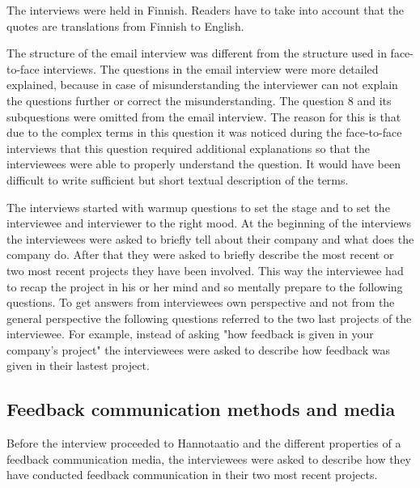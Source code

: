 \documentclass[english,12pt,a4paper,pdftex]{article}
\begin{document}
The interviews were held in Finnish. Readers have to take into account that the quotes are translations from Finnish to English.


The structure of the email interview was different from the structure used in face-to-face interviews. The questions in the email interview were more detailed explained, because in case of misunderstanding the interviewer can not explain the questions further or correct the misunderstanding. The question 8 and its subquestions were omitted from the email interview. The reason for this is that due to the complex terms in this question it was noticed during the face-to-face interviews that this question required additional explanations so that the interviewees were able to properly understand the question. It would have been difficult to write sufficient but short textual description of the terms.

The interviews started with warmup questions to set the stage and to set the interviewee and interviewer to the right mood. At the beginning of the interviews the interviewees were asked to briefly tell about their company and what does the company do. After that they were asked to briefly describe the most recent or two most recent projects they have been involved. This way the interviewee had to recap the project in his or her mind and so mentally prepare to the following questions. To get answers from interviewees own perspective and not from the general perspective the following questions referred to the two last projects of the interviewee. For example, instead of asking "how feedback is given in your company's project" the interviewees were asked to describe how feedback was given in their lastest project.

\subsection{Feedback communication methods and media}

Before the interview proceeded to Hannotaatio and the different properties of a feedback communication media, the interviewees were asked to describe how they have conducted feedback communication in their two most recent projects.

\end{document}
